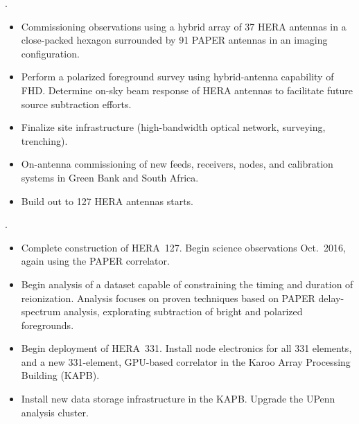 \documentclass[preprint]{aastex}
\begin{document}
\vspace{-7pt}
.  
\begin{itemize}\setlength{\parskip}{0pt}\itemsep0pt
\vspace{-7pt}
  \item Commissioning observations using a hybrid array of 37 HERA antennas in a close-packed hexagon surrounded by 91 PAPER antennas in an imaging configuration.
  \item Perform a polarized foreground survey using hybrid-antenna capability of FHD. Determine on-sky beam response of HERA antennas to facilitate future source subtraction efforts.
  \item Finalize site infrastructure (high-bandwidth optical network, surveying, trenching).
  \item On-antenna commissioning of new feeds, receivers, nodes, and calibration systems in Green Bank and South Africa.
  \item Build out to 127 HERA antennas starts.
\end{itemize}

\vspace{-7pt}
.
\begin{itemize}\setlength{\parskip}{0pt}\itemsep0pt
\vspace{-7pt}
  \item Complete construction of HERA~127. Begin science observations Oct.\ 2016, again using the PAPER correlator.
  \item Begin analysis of a dataset capable of constraining the timing and duration of reionization. 
Analysis focuses on proven techniques based on PAPER delay-spectrum analysis, explorating subtraction of bright 
and polarized foregrounds.
  \item Begin deployment of HERA~331. Install node electronics for all 331 elements, and a new 331-element, 
GPU-based correlator in the Karoo Array Processing Building (KAPB).
  \item  Install new data storage infrastructure in the KAPB.  
Upgrade the UPenn analysis cluster.
\end{itemize}
\end{document}
